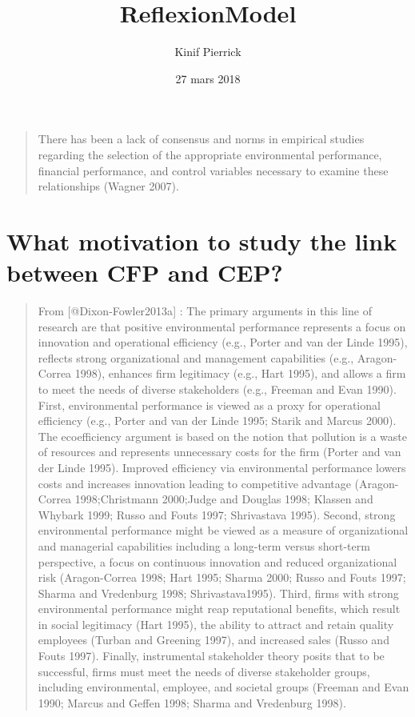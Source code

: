 \documentclass[]{article}
\title{ReflexionModel}
\author{Kinif Pierrick}
\date{27 mars 2018}
\begin{document}
\maketitle

\begin{quote}
There has been a lack of consensus and norms in empirical studies
regarding the selection of the appropriate environmental performance,
financial performance, and control variables necessary to examine these
relationships (Wagner 2007).
\end{quote}

\section{What motivation to study the link between CFP and
CEP?}\label{what-motivation-to-study-the-link-between-cfp-and-cep}

\begin{quote}
From {[}@Dixon-Fowler2013a{]} : The primary arguments in this line of
research are that positive environmental performance represents a focus
on innovation and operational efficiency (e.g., Porter and van der Linde
1995), reflects strong organizational and management capabilities (e.g.,
Aragon-Correa 1998), enhances firm legitimacy (e.g., Hart 1995), and
allows a firm to meet the needs of diverse stakeholders (e.g., Freeman
and Evan 1990). First, environmental performance is viewed as a proxy
for operational efficiency (e.g., Porter and van der Linde 1995; Starik
and Marcus 2000). The ecoefficiency argument is based on the notion that
pollution is a waste of resources and represents unnecessary costs for
the firm (Porter and van der Linde 1995). Improved efficiency via
environmental performance lowers costs and increases innovation leading
to competitive advantage (Aragon-Correa 1998;Christmann 2000;Judge and
Douglas 1998; Klassen and Whybark 1999; Russo and Fouts 1997;
Shrivastava 1995). Second, strong environmental performance might be
viewed as a measure of organizational and managerial capabilities
including a long-term versus short-term perspective, a focus on
continuous innovation and reduced organizational risk (Aragon-Correa
1998; Hart 1995; Sharma 2000; Russo and Fouts 1997; Sharma and
Vredenburg 1998; Shrivastava1995). Third, firms with strong
environmental performance might reap reputational benefits, which result
in social legitimacy (Hart 1995), the ability to attract and retain
quality employees (Turban and Greening 1997), and increased sales (Russo
and Fouts 1997). Finally, instrumental stakeholder theory posits that to
be successful, firms must meet the needs of diverse stakeholder groups,
including environmental, employee, and societal groups (Freeman and Evan
1990; Marcus and Geffen 1998; Sharma and Vredenburg 1998).
\end{quote}
\end{document}
